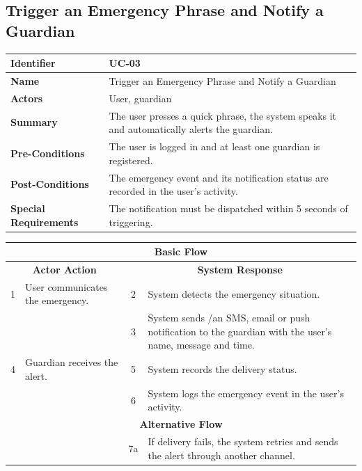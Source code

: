 \documentclass{FastFyp}
\begin{document}
\subsection{Trigger an Emergency Phrase and Notify a Guardian}
\begin{table}[H]
\centering
\renewcommand{\arraystretch}{1.3}
\begin{tabularx}{\textwidth}{|l|X|}
\hline
\textbf{Identifier} & UC-03 \\ \hline
\textbf{Name} & Trigger an Emergency Phrase and Notify a Guardian \\ \hline
\textbf{Actors} & User, guardian \\ \hline
\textbf{Summary} & The user presses a quick phrase, the system speaks it and automatically alerts the guardian. \\ \hline
\textbf{Pre-Conditions} & The user is logged in and at least one guardian is registered. \\ \hline
\textbf{Post-Conditions} & The emergency event and its notification status are recorded in the user's activity. \\ \hline
\textbf{Special Requirements} & The notification must be dispatched within 5 seconds of triggering. \\ \hline
\end{tabularx}

\vspace{-\arrayrulewidth}
\begin{tabularx}{\textwidth}{|c|X|c|X|}
\hline
\multicolumn{4}{|c|}{\textbf{Basic Flow}} \\ \hline
\multicolumn{2}{|c|}{\textbf{Actor Action}} & \multicolumn{2}{c|}{\textbf{System Response}} \\ \hline
1 & User communicates the emergency. & 2 & System detects the emergency situation. \\ \hline
 & & 3 & System sends /an SMS, email or push notification to the guardian with the user's name, message and time. \\ \hline
4 & Guardian receives the alert. & 5 & System records the delivery status. \\ \hline
 & & 6 & System logs the emergency event in the user's activity. \\ \hline
\multicolumn{4}{|c|}{\textbf{Alternative Flow}} \\ \hline
 & & 7a & If delivery fails, the system retries and sends the alert through another channel. \\ \hline
\end{tabularx}
\end{table}
\end{document}
